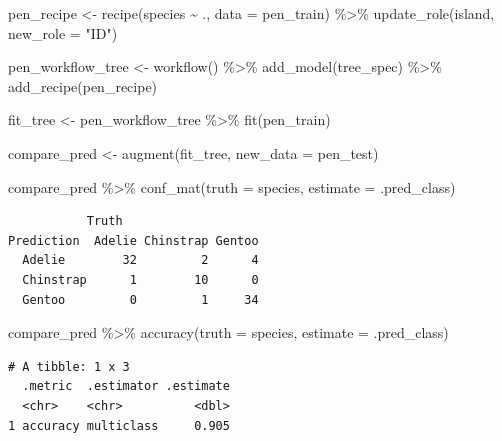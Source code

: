 \documentclass[
  letterpaper,
  DIV=11,
  numbers=noendperiod]{scrreprt}
\newenvironment{Shaded}{\begin{snugshade}}{\end{snugshade}}
\newcommand{\AttributeTok}[1]{\textcolor[rgb]{0.40,0.45,0.13}{#1}}
\newcommand{\FunctionTok}[1]{\textcolor[rgb]{0.28,0.35,0.67}{#1}}
\newcommand{\NormalTok}[1]{\textcolor[rgb]{0.00,0.23,0.31}{#1}}
\newcommand{\OtherTok}[1]{\textcolor[rgb]{0.00,0.23,0.31}{#1}}
\newcommand{\SpecialCharTok}[1]{\textcolor[rgb]{0.37,0.37,0.37}{#1}}
\newcommand{\StringTok}[1]{\textcolor[rgb]{0.13,0.47,0.30}{#1}}
\begin{document}
\begin{Shaded}
\begin{Highlighting}[]
\NormalTok{pen\_recipe }\OtherTok{\textless{}{-}} 
  \FunctionTok{recipe}\NormalTok{(species }\SpecialCharTok{\textasciitilde{}}\NormalTok{ ., }\AttributeTok{data =}\NormalTok{ pen\_train) }\SpecialCharTok{\%\textgreater{}\%} 
  \FunctionTok{update\_role}\NormalTok{(island,  }\AttributeTok{new\_role =} \StringTok{"ID"}\NormalTok{)}

\NormalTok{pen\_workflow\_tree }\OtherTok{\textless{}{-}} \FunctionTok{workflow}\NormalTok{() }\SpecialCharTok{\%\textgreater{}\%}
  \FunctionTok{add\_model}\NormalTok{(tree\_spec) }\SpecialCharTok{\%\textgreater{}\%}
  \FunctionTok{add\_recipe}\NormalTok{(pen\_recipe)}

\NormalTok{fit\_tree }\OtherTok{\textless{}{-}}\NormalTok{ pen\_workflow\_tree }\SpecialCharTok{\%\textgreater{}\%} \FunctionTok{fit}\NormalTok{(pen\_train)}
\end{Highlighting}
\end{Shaded}

\begin{Shaded}
\begin{Highlighting}[]
\NormalTok{compare\_pred }\OtherTok{\textless{}{-}} \FunctionTok{augment}\NormalTok{(fit\_tree, }\AttributeTok{new\_data =}\NormalTok{ pen\_test) }

\NormalTok{compare\_pred }\SpecialCharTok{\%\textgreater{}\%} \FunctionTok{conf\_mat}\NormalTok{(}\AttributeTok{truth =}\NormalTok{ species, }\AttributeTok{estimate =}\NormalTok{ .pred\_class)}
\end{Highlighting}
\end{Shaded}

\begin{verbatim}
           Truth
Prediction  Adelie Chinstrap Gentoo
  Adelie        32         2      4
  Chinstrap      1        10      0
  Gentoo         0         1     34
\end{verbatim}

\begin{Shaded}
\begin{Highlighting}[]
\NormalTok{compare\_pred }\SpecialCharTok{\%\textgreater{}\%}  \FunctionTok{accuracy}\NormalTok{(}\AttributeTok{truth =}\NormalTok{ species, }\AttributeTok{estimate =}\NormalTok{ .pred\_class)}
\end{Highlighting}
\end{Shaded}

\begin{verbatim}
# A tibble: 1 x 3
  .metric  .estimator .estimate
  <chr>    <chr>          <dbl>
1 accuracy multiclass     0.905
\end{verbatim}
\end{document}
